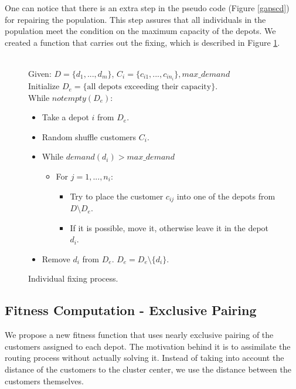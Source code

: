 \documentclass[conference]{IEEEtran}
\begin{document}
One can notice that there is an extra step in the pseudo code (Figure \ref{gapscd}) for repairing the population. This step assures that all individuals in the population meet the condition on the maximum capacity of the depots. We created a function that carries out the fixing, which is described in Figure \ref{reppscd}.
\begin{figure}[b]
    \hrulefill\\
  Given: $D = \{d_1,...,d_m\}$, $C_i = \{c_{i1},...,c_{in_i}\}, max\_demand$ \\
  Initialize $D_e = \{\text{all depots exceeding their capacity}\}$. \\
  While $not empty(D_e)$: 
  \begin{itemize}
    \item Take a depot $i$ from $D_e$.
    \item Random shuffle customers $C_i$.
    \item While $demand(d_i) > max\_demand$
    \begin{itemize}
      \item For $j = 1,...,n_i$: 
      \begin{itemize}
        \item Try to place the customer $c_{ij}$ into one of the depots from $D \setminus D_e$.
        \item If it is possible, move it, otherwise leave it in the depot $d_i$.
      \end{itemize}
    \end{itemize}
    \item Remove $d_i$ from $D_e$. $D_e = D_e \setminus \{d_i\}$.
  \end{itemize}

  \hrulefill
    \caption{Individual fixing process.}
    \label{reppscd}
\end{figure}

\subsection{Fitness Computation - Exclusive Pairing} %
\label{sub:fitness_computation_exclusive_pairing}
We propose a new fitness function that uses nearly exclusive pairing of the customers assigned to each depot. The motivation behind it is to assimilate the routing process without actually solving it. Instead of taking into account the distance of the customers to the cluster center, we use the distance between the customers themselves.
\end{document}
